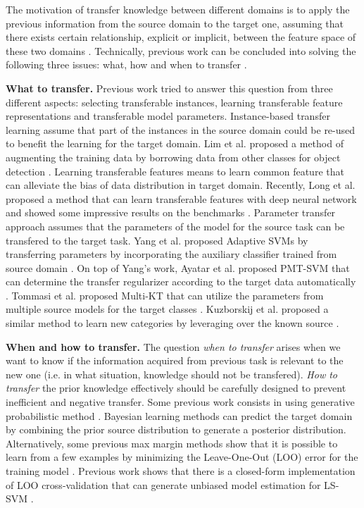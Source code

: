 The motivation of transfer knowledge between different domains is to apply the previous information from the source domain to the target one, assuming that there exists certain relationship, explicit or implicit, between the  feature space of these two domains \cite{pan2010survey}. Technically, previous work can be concluded into solving the following three issues: what, how and when to transfer \cite{tommasi2014learning}.


\textbf{What to transfer.} Previous work tried to answer this question from three different aspects: selecting transferable instances, learning transferable feature representations and transferable model parameters. Instance-based transfer learning assume that part of the instances in the source domain could be re-used to benefit the learning for the target domain. Lim et al. proposed a method of augmenting the training data by borrowing data from other classes for object detection \cite{lim2012transfer}. Learning transferable features means to learn common feature that can alleviate the bias of data distribution in target domain. Recently, Long et al. proposed a method that can learn transferable features with deep neural network and showed some impressive results on the  benchmarks \cite{LongICML15}. Parameter transfer
approach assumes that the parameters of the model for the source task can be transfered to the target task. Yang et al. proposed Adaptive SVMs by transferring parameters by incorporating the auxiliary classifier trained from source domain \cite{yang2007cross}. On top of Yang's work, Ayatar et al. proposed PMT-SVM that can determine the transfer regularizer according to the target data automatically \cite{aytar2011tabula}. Tommasi et al. proposed Multi-KT that can utilize the parameters from multiple source models for the target classes  \cite{tommasi2014learning}.
Kuzborskij et al. proposed a similar method to learn new categories by leveraging over the known source \cite{kuzborskij2013n}.

\textbf{When and how to transfer.} The question \textit{when to transfer} arises when we want to know if the information acquired from previous task is relevant to the new one (i.e. in what situation, knowledge should not be transfered). 
\textit{How to transfer} the prior knowledge effectively should be carefully designed to prevent inefficient and negative transfer. Some previous work consists in using generative probabilistic method \cite{davis2009deep} \cite{wang2014active} \cite{zhou2014multi}.  Bayesian learning methods can predict the target domain by combining the prior source distribution to generate a posterior distribution. Alternatively, some previous max margin methods show that it is possible to learn from a few examples by minimizing the  Leave-One-Out (LOO) error for the training model \cite{kuzborskij2013n} \cite{tommasi2010safety}. Previous work shows that there is a closed-form implementation of LOO cross-validation that can generate unbiased model estimation for LS-SVM \cite{cawley2006leave}.

